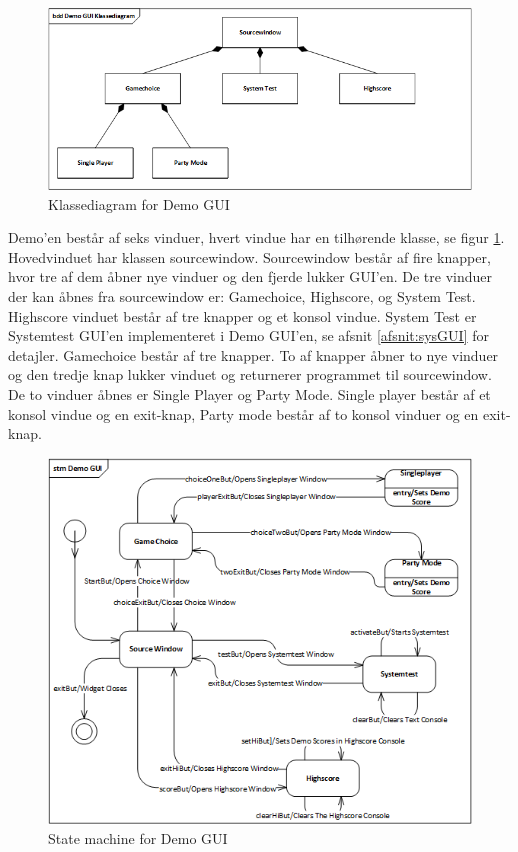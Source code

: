 \begin{figure}[H]
	\centering
	\includegraphics[width=1.2\textwidth]{Afsnit/DesignOgImplementering/images/DemoGUIClass}
	\caption{Klassediagram for Demo GUI}
	\label{fig:DemoGUIClass}
\end{figure}

\noindent Demo'en består af seks vinduer, hvert vindue har en tilhørende klasse, se figur \ref{fig:DemoGUIClass}. Hovedvinduet har klassen sourcewindow. Sourcewindow består af fire knapper, hvor tre af dem åbner nye vinduer og den fjerde lukker GUI'en. De tre vinduer der kan åbnes fra sourcewindow er: Gamechoice, Highscore, og System Test. Highscore vinduet består af tre knapper og et konsol vindue. System Test er Systemtest GUI'en implementeret i Demo GUI'en, se afsnit \ref{afsnit:sysGUI} for detajler. Gamechoice består af tre knapper. To af knapper åbner to nye vinduer og den tredje knap lukker vinduet og returnerer programmet til sourcewindow. De to vinduer åbnes er Single Player og Party Mode. Single player består af et konsol vindue og en exit-knap, Party mode består af to konsol vinduer og en exit-knap.


\begin{figure}[H]
	\centering
	\includegraphics[width=1.2\textwidth]{Afsnit/DesignOgImplementering/images/StateMachineDemoGUI}
	\caption{State machine for Demo GUI}
	\label{fig:StateMachineDemo}
\end{figure}

